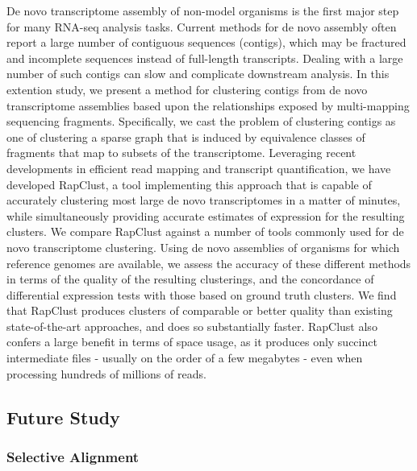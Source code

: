 De novo transcriptome assembly of non-model organisms is the first major step for many 
RNA-seq analysis tasks. Current methods for de novo assembly often report a large number 
of contiguous sequences (contigs), which may be fractured and incomplete sequences 
instead of full-length transcripts. Dealing with a large number of such contigs can 
slow and complicate downstream analysis. In this extention study, we present a method 
for clustering contigs from de novo transcriptome assemblies based upon the relationships 
exposed by multi-mapping sequencing fragments. Specifically, we cast the problem of 
clustering contigs as one of clustering a sparse graph that is induced by equivalence 
classes of fragments that map to subsets of the transcriptome. Leveraging recent developments 
in efficient read mapping and transcript quantification, we have developed RapClust, a tool 
implementing this approach that is capable of accurately clustering most large de novo 
transcriptomes in a matter of minutes, while simultaneously providing accurate estimates of 
expression for the resulting clusters. We compare RapClust against a number of tools commonly 
used for de novo transcriptome clustering. Using de novo assemblies of organisms for which 
reference genomes are available, we assess the accuracy of these different methods in terms of 
the quality of the resulting clusterings, and the concordance of differential expression tests 
with those based on ground truth clusters. We find that RapClust produces clusters of comparable 
or better quality than existing state-of-the-art approaches, and does so substantially faster. 
RapClust also confers a large benefit in terms of space usage, as it produces only succinct 
intermediate files - usually on the order of a few megabytes - even when processing hundreds 
of millions of reads.

\subsection{Future Study}
\subsubsection{Selective Alignment ~\citep{selaln}}

